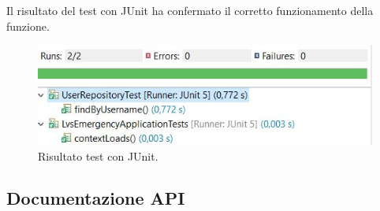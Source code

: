 

Il risultato del test con JUnit ha confermato il corretto funzionamento della funzione.

\begin{figure}[h!]
	\centering
	\includegraphics[width=1\linewidth]{./Iterazione 2/ImageFiles/TestJUnit}
	\caption{Risultato test con JUnit.}
	\label{fig:RisultatiTestJunitIT2}
\end{figure}

\subsection{Documentazione API}

